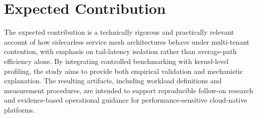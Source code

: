 \section{Expected Contribution}
The expected contribution is a technically rigorous and practically relevant account of how sidecarless service mesh architectures behave under multi-tenant contention, with emphasis on tail-latency isolation rather than average-path efficiency alone. By integrating controlled benchmarking with kernel-level profiling, the study aims to provide both empirical validation and mechanistic explanation. The resulting artifacts, including workload definitions and measurement procedures, are intended to support reproducible follow-on research and evidence-based operational guidance for performance-sensitive cloud-native platforms.

